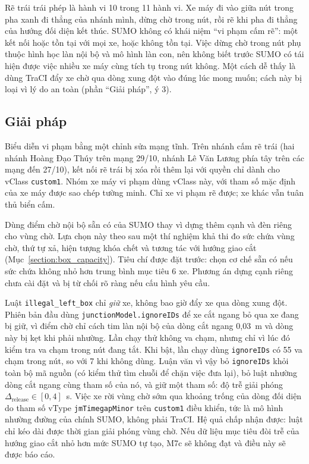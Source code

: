 \documentclass[../main.tex]{subfiles}
\begin{document}
Rẽ trái trái phép là hành vi 10 trong 11 hành vi. Xe máy đi vào giữa nút trong pha xanh đi thẳng của nhánh mình, dừng chờ trong nút, rồi rẽ khi pha đi thẳng của hướng đối diện kết thúc. SUMO không có khái niệm ``vi phạm cấm rẽ'': một kết nối hoặc tồn tại với mọi xe, hoặc không tồn tại. Việc dừng chờ trong nút phụ thuộc hình học làn nội bộ và mô hình làn con, nên không biết trước SUMO có tái hiện được việc nhiều xe máy cùng tích tụ trong nút không. Một cách dễ thấy là dùng TraCI đẩy xe chờ qua dòng xung đột vào đúng lúc mong muốn; cách này bị loại vì lý do an toàn (phần ``Giải pháp'', ý 3).

\subsection{Giải pháp}

Biểu diễn vi phạm bằng một chỉnh sửa mạng tĩnh. Trên nhánh cấm rẽ trái (hai nhánh Hoàng Đạo Thúy trên mạng 29/10, nhánh Lê Văn Lương phía tây trên các mạng đến 27/10), kết nối rẽ trái bị xóa rồi thêm lại với quyền chỉ dành cho vClass \texttt{custom1}. Nhóm xe máy vi phạm dùng vClass này, với tham số mặc định của xe máy được sao chép tường minh. Chỉ xe vi phạm rẽ được; xe khác vẫn tuân thủ biển cấm.

Dùng điểm chờ nội bộ sẵn có của SUMO thay vì dựng thêm cạnh và đèn riêng cho vùng chờ. Lựa chọn này theo sau một thí nghiệm khả thi đo sức chứa vùng chờ, thứ tự xả, hiện tượng khóa chết và tương tác với hướng giao cắt (Mục~\ref{section:box_capacity}). Tiêu chí được đặt trước: chọn cơ chế sẵn có nếu sức chứa không nhỏ hơn trung bình mục tiêu 6 xe. Phương án dựng cạnh riêng chưa cài đặt và bị từ chối rõ ràng nếu cấu hình yêu cầu.

Luật \texttt{illegal\_left\_box} chỉ \emph{giữ} xe, không bao giờ đẩy xe qua dòng xung đột. Phiên bản đầu dùng \texttt{junctionModel.ignoreIDs} để xe cắt ngang bỏ qua xe đang bị giữ, vì điểm chờ chỉ cách tim làn nội bộ của dòng cắt ngang 0,03~m và dòng này bị kẹt khi phải nhường. Lần chạy thử không va chạm, nhưng chỉ vì lúc đó kiểm tra va chạm trong nút đang tắt. Khi bật, lần chạy dùng \texttt{ignoreIDs} có 55 va chạm trong nút, so với 7 khi không dùng. Luận văn vì vậy bỏ \texttt{ignoreIDs} khỏi toàn bộ mã nguồn (có kiểm thử tìm chuỗi để chặn việc đưa lại), bỏ luật nhường dòng cắt ngang cùng tham số của nó, và giữ một tham số: độ trễ giải phóng $\Delta_{\text{release}} \in [0,4]$~s. Việc xe rời vùng chờ sớm qua khoảng trống của dòng đối diện do tham số vType \texttt{jmTimegapMinor} trên \texttt{custom1} điều khiển, tức là mô hình nhường đường của chính SUMO, không phải TraCI. Hệ quả chấp nhận được: luật chỉ kéo dài được thời gian giải phóng vùng chờ. Nếu dữ liệu mục tiêu đòi trễ của hướng giao cắt nhỏ hơn mức SUMO tự tạo, M7c sẽ không đạt và điều này sẽ được báo cáo.
\end{document}
